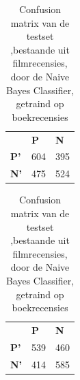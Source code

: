 \begin{table}
\centering
\setlength\tabcolsep{4pt}
\begin{minipage}[t]{0.48\textwidth}
\centering
\begin{tabular}{lll}
                                 & \textbf{P}               & \textbf{N}               \\ \cline{2-3} 
\multicolumn{1}{l|}{\textbf{P'}} & \multicolumn{1}{l|}{604} & \multicolumn{1}{l|}{395} \\ \cline{2-3} 
\multicolumn{1}{l|}{\textbf{N'}} & \multicolumn{1}{l|}{475} & \multicolumn{1}{l|}{524} \\ \cline{2-3} 
\end{tabular}
\caption{Confusion matrix van de testset, bestaande uit muziekrecensies, door de  Naive Bayes Classifier, getraind op boekrecensies} 
\end{minipage}%
\hfill
\begin{minipage}[t]{0.48\textwidth}
\centering
\begin{tabular}{lll}
                                 & \textbf{P}               & \textbf{N}               \\ \cline{2-3} 
\multicolumn{1}{l|}{\textbf{P'}} & \multicolumn{1}{l|}{539} & \multicolumn{1}{l|}{460} \\ \cline{2-3} 
\multicolumn{1}{l|}{\textbf{N'}} & \multicolumn{1}{l|}{414} & \multicolumn{1}{l|}{585} \\ \cline{2-3} 
\end{tabular}
\caption{Confusion matrix van de testset ,bestaande uit filmrecensies, door de  Naive Bayes Classifier, getraind op boekrecensies} 
\end{minipage}
\end{table}


